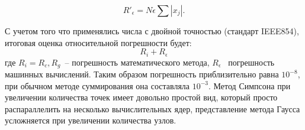 \begin{equation}
R'_{\epsilon} =N\epsilon\sum|x_j|.
\end{equation}


С учетом того что применялись числа с двойной точностью (стандарт IEEE854), итоговая оценка относительной погрешности будет: 
\begin{equation}
 R_i+R_{\epsilon}
\end{equation}
где $R_i = R_c, R_g$~-- погрешность математического метода, $R_\epsilon$~ погрешность машинных вычислений. Таким образом погрешность приблизительно равна $10^{-8}$, при обычном методе суммирования она составляла $10^{-3}$. Метод Симпсона при увеличении количества точек имеет довольно простой вид, который просто распараллелить на несколько вычислительных ядер, представление метода Гаусса усложняется при увеличении количества узлов.
